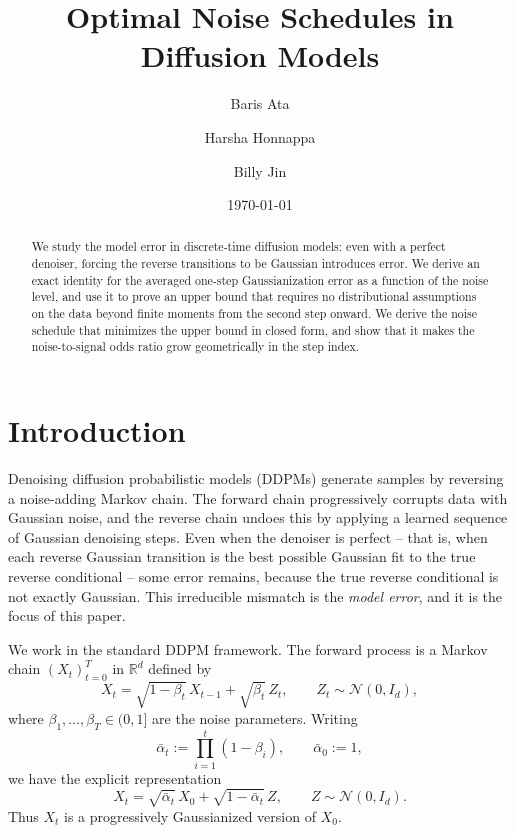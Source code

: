 \documentclass[11pt]{article}
\title{Optimal Noise Schedules in Diffusion Models}
\author{Baris Ata \and Harsha Honnappa \and Billy Jin}
\date{\today}
\def\R{\mathbb{R}}
\begin{document}
\maketitle

\begin{abstract}
We study the model error in discrete-time diffusion models: even with a perfect denoiser, forcing the reverse transitions to be Gaussian introduces error.
We derive an exact identity for the averaged one-step Gaussianization error as a function of the noise level, and use it to prove an upper bound that requires no distributional assumptions on the data beyond finite moments from the second step onward. We derive the noise schedule that minimizes the upper bound in closed form, and show that it makes the noise-to-signal odds ratio grow geometrically in the step index.
\end{abstract}

\section{Introduction}

Denoising diffusion probabilistic models (DDPMs) \cite{sohl2015deep,ho2020denoising} generate samples by reversing a noise-adding Markov chain. The forward chain progressively corrupts data with Gaussian noise, and the reverse chain undoes this by applying a learned sequence of Gaussian denoising steps. Even when the denoiser is perfect -- that is, when each reverse Gaussian transition is the best possible Gaussian fit to the true reverse conditional -- some error remains, because the true reverse conditional is not exactly Gaussian. This irreducible mismatch is the \emph{model error}, and it is the focus of this paper.

\medskip

We work in the standard DDPM framework. The forward process is a Markov chain \((X_t)_{t=0}^T\) in \(\R^d\) defined by
\begin{equation}
\label{eq:forward_chain}
X_t = \sqrt{1-\beta_t}\,X_{t-1} + \sqrt{\beta_t}\,Z_t,
\qquad
Z_t \sim \mathcal N(0,I_d),
\end{equation}
where \(\beta_1,\dots,\beta_T\in(0,1]\) are the noise parameters. Writing
\[
\bar\alpha_t := \prod_{i=1}^t (1-\beta_i),
\qquad
\bar\alpha_0:=1,
\]
we have the explicit representation
\[
X_t = \sqrt{\bar\alpha_t}\,X_0 + \sqrt{1-\bar\alpha_t}\,Z,
\qquad
Z\sim\mathcal N(0,I_d).
\]
Thus \(X_t\) is a progressively Gaussianized version of \(X_0\).
\end{document}
